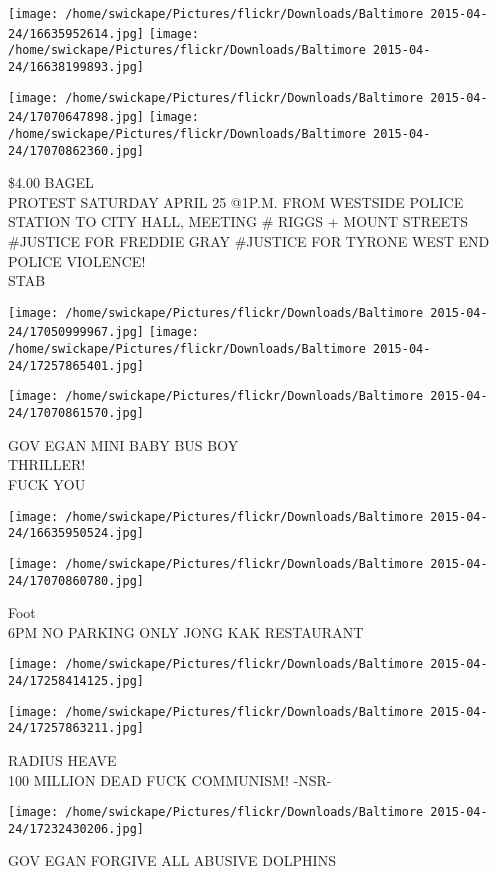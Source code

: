\documentclass[10pt,letterpaper]{article}
\begin{document}
\texttt{[image: /home/swickape/Pictures/flickr/Downloads/Baltimore 2015-04-24/16635952614.jpg]}
\texttt{[image: /home/swickape/Pictures/flickr/Downloads/Baltimore 2015-04-24/16638199893.jpg]}

\texttt{[image: /home/swickape/Pictures/flickr/Downloads/Baltimore 2015-04-24/17070647898.jpg]}
\texttt{[image: /home/swickape/Pictures/flickr/Downloads/Baltimore 2015-04-24/17070862360.jpg]}

\$4.00 BAGEL\\
PROTEST SATURDAY APRIL 25 @1P.M. FROM WESTSIDE POLICE STATION TO CITY HALL, MEETING \# RIGGS + MOUNT STREETS\\
\#JUSTICE FOR FREDDIE GRAY \#JUSTICE FOR TYRONE WEST END POLICE VIOLENCE!\\
STAB
\pagebreak

\texttt{[image: /home/swickape/Pictures/flickr/Downloads/Baltimore 2015-04-24/17050999967.jpg]}
\texttt{[image: /home/swickape/Pictures/flickr/Downloads/Baltimore 2015-04-24/17257865401.jpg]}

\texttt{[image: /home/swickape/Pictures/flickr/Downloads/Baltimore 2015-04-24/17070861570.jpg]}

GOV EGAN MINI BABY BUS BOY\\
THRILLER!\\
FUCK YOU
\pagebreak

\texttt{[image: /home/swickape/Pictures/flickr/Downloads/Baltimore 2015-04-24/16635950524.jpg]}

\vspace{0.25in}
\texttt{[image: /home/swickape/Pictures/flickr/Downloads/Baltimore 2015-04-24/17070860780.jpg]}

Foot\\
6PM NO PARKING ONLY JONG KAK RESTAURANT
\pagebreak

\texttt{[image: /home/swickape/Pictures/flickr/Downloads/Baltimore 2015-04-24/17258414125.jpg]}

\vspace{0.25in}
\texttt{[image: /home/swickape/Pictures/flickr/Downloads/Baltimore 2015-04-24/17257863211.jpg]}

RADIUS HEAVE\\
100 MILLION DEAD FUCK COMMUNISM!  {-}NSR{-}
\pagebreak

\texttt{[image: /home/swickape/Pictures/flickr/Downloads/Baltimore 2015-04-24/17232430206.jpg]}

GOV EGAN FORGIVE ALL ABUSIVE DOLPHINS
\pagebreak
\end{document}
